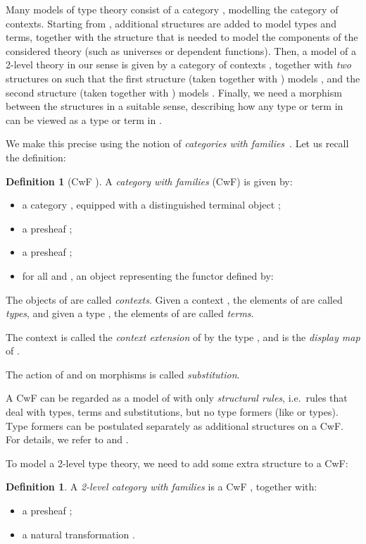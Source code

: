 \documentclass[a4paper,reqno]{amsart}
\theoremstyle{plain}
\theoremstyle{definition}
\newtheorem{definition}[theorem]{Definition}
\begin{document}
Many models of type theory consist of a category , modelling the category of contexts.
Starting from , additional structures are added to model types and terms, together with the structure that is needed to model the components of the considered theory (such as universes or dependent functions).
Then, a model of a 2-level theory in our sense is given by a category of contexts , together with \emph{two} structures on  such that the first structure (taken together with ) models , and the second structure (taken together with ) models .
Finally, we need a morphism between the structures in a suitable sense, describing how any type or term in  can be viewed as a type or term in . 

We make this precise using the notion of \emph{categories with families}~\cite{dybjer1995internal}.  Let us recall the definition:

\begin{definition}[CwF {\cite{dybjer1995internal}}]
A \emph{category with families} (CwF) is given by:
\begin{itemize}
\item a category , equipped with a distinguished terminal object ;
\item a presheaf ;
\item a presheaf ;
\item for all  and , an object  representing the functor  defined by:

\end{itemize}

The objects of  are called \emph{contexts}. Given a context , the
elements of  are called \emph{types}, and given a type , the
elements of  are called \emph{terms}.

The context  is called the \emph{context extension} of  by the
type , and  is the \emph{display map} of .

The action of  and  on morphisms is called \emph{substitution}.
\end{definition}

A CwF can be regarded as a model of  with only
\emph{structural rules}, i.e.\ rules that deal with types, terms and
substitutions, but no type formers (like  or  types).  Type formers
can be postulated separately as additional structures on a CwF.
For details, we refer to \cite{dybjer1995internal} and \cite{hofmann_syntaxSemantics}.

To model a 2-level type theory, we need to add some extra structure to a CwF:
\begin{definition}\label{def:cwf2}
A \emph{2-level category with families} is a CwF , together with:
\begin{itemize}
\item a presheaf ;
\item a natural transformation .
\end{itemize}
\end{definition}
\end{document}

